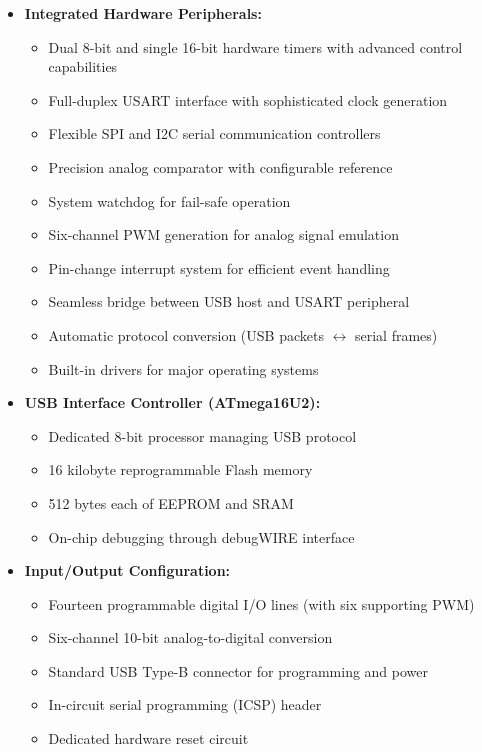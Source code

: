 {\begin{itemize}
		\item \textbf{Integrated Hardware Peripherals:}
		\begin{itemize}
			\item Dual 8-bit and single 16-bit hardware timers with advanced control capabilities
			\item Full-duplex USART interface with sophisticated clock generation
			\item Flexible SPI and I2C serial communication controllers
			\item Precision analog comparator with configurable reference
			\item System watchdog for fail-safe operation
			\item Six-channel PWM generation for analog signal emulation
			\item Pin-change interrupt system for efficient event handling
		    \item Seamless bridge between USB host and USART peripheral
			\item Automatic protocol conversion (USB packets $\leftrightarrow$ serial frames)
			\item Built-in drivers for major operating systems
		\end{itemize}
		
		\item \textbf{USB Interface Controller (ATmega16U2):}
		\begin{itemize}
			\item Dedicated 8-bit processor managing USB protocol
			\item 16 kilobyte reprogrammable Flash memory
			\item 512 bytes each of EEPROM and SRAM
			\item On-chip debugging through debugWIRE interface
		\end{itemize}
		
		\item \textbf{Input/Output Configuration:}
		\begin{itemize}
			\item Fourteen programmable digital I/O lines (with six supporting PWM)
			\item Six-channel 10-bit analog-to-digital conversion
			\item Standard USB Type-B connector for programming and power
			\item In-circuit serial programming (ICSP) header
			\item Dedicated hardware reset circuit
		\end{itemize}
		

\end{itemize}}
